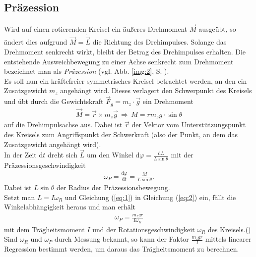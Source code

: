\subsection{Präzession}
Wird auf einen rotierenden Kreisel ein äußeres Drehmoment $\vec{M}$ ausgeübt, so ändert dies aufgrund $\vec{M}=\dot{\vec{L}}$ die Richtung des Drehimpulses. Solange das Drehmoment senkrecht wirkt, bleibt der Betrag des Drehimpulses erhalten. Die entstehende Ausweichbewegung zu einer Achse senkrecht zum Drehmoment bezeichnet man als \textit{Präzession} (vgl. Abb. \ref{img:2}, S. \pageref{img:2}).\\
Es soll nun ein kräftefreier symmetrisches Kreisel betrachtet werden, an den ein Zusatzgewicht $m_z$ angehängt wird. Dieses verlagert den Schwerpunkt des Kreisels und übt durch die Gewichtskraft $\vec{F}_g=m_z\cdot\vec{g}$ ein Drehmoment 
\begin{align}
\vec{M}=\vec{r}\times m_z\vec{g}\, \Rightarrow\, M=rm_zg\cdot\sin\theta
\label{eq:1}
\end{align}
auf die Drehimpulsachse aus. Dabei ist $\vec{r}$ der Vektor vom Unterstützungspunkt des Kreisels zum Angriffspunkt der Schwerkraft (also der Punkt, an dem das Zusatzgewicht angehängt wird).\\
In der Zeit $\mathrm dt$ dreht sich $\vec{L}$ um den Winkel $\mathrm d\varphi=\frac{\mathrm dL}{L\sin\theta}$ mit der Präzessionsgeschwindigkeit 
\begin{align}
\omega_P=\frac{\mathrm d\varphi}{\mathrm dt}=\frac{M}{L\sin\theta}.
\label{eq:2}
\end{align}
Dabei ist $L\sin\theta$ der Radius der Präzessionsbewegung.\\
Setzt man $L=I\omega_R$ und Gleichung (\ref{eq:1}) in Gleichung (\ref{eq:2}) ein, fällt die Winkelabhängigkeit heraus und man erhält
\begin{align}
\omega_P=\frac{m_zgr}{I\omega_K}
\label{eq:3}
\end{align}
mit dem Trägheitsmoment $I$ und der Rotationsgeschwindigkeit $\omega_R$ des Kreisels.(\cite{Demtroeder2008})\\
Sind $\omega_R$ und $\omega_P$ durch Messung bekannt, so kann der Faktor $\frac{m_zgr}{I}$ mittels linearer Regression bestimmt werden, um daraus das Trägheitsmoment zu berechnen.
%
